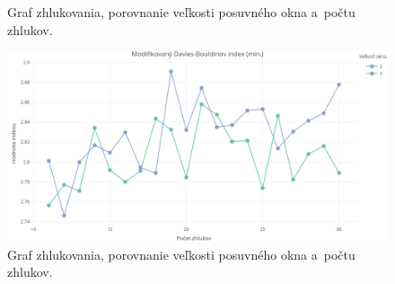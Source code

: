 \documentclass[a4paper,twoside,slovak,12pt,appendix]{article}
\begin{document}
\begin{appendices}
\begin{figure}[htbp]
  \caption{Graf zhlukovania, porovnanie veľkosti posuvného okna a~počtu zhlukov.}
\end{figure}
\begin{figure}[htbp]
  \centering
  \includegraphics[width=\textwidth]{cvi/dtw_basic_workdays_dense/201902271851-DBstar-dtw_basic_workdays_dense.png}
  \caption{Graf zhlukovania, porovnanie veľkosti posuvného okna a~počtu zhlukov.}
\end{figure}


\end{appendices}
\end{document}
